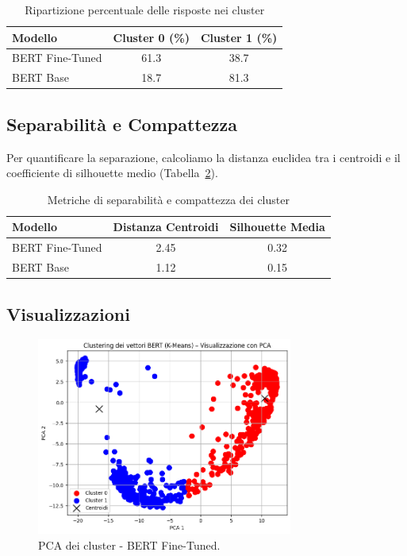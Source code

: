 \documentclass[a4paper,12pt]{article}
\begin{document}
\begin{table}[htbp]
  \centering
  \caption{Ripartizione percentuale delle risposte nei cluster}
  \label{tab:distribuzione}
  \begin{tabular}{lcc}
    \hline
    \textbf{Modello} & \textbf{Cluster 0 (\%)} & \textbf{Cluster 1 (\%)} \\
    \hline
    BERT Fine-Tuned & 61.3 & 38.7 \\
    BERT Base      & 18.7 & 81.3 \\
    \hline
  \end{tabular}
\end{table}

\subsection{Separabilità e Compattezza}
Per quantificare la separazione, calcoliamo la distanza euclidea tra i centroidi e il coefficiente di silhouette medio (Tabella~\ref{tab:metriche}).

\begin{table}[htbp]
  \centering
  \caption{Metriche di separabilità e compattezza dei cluster}
  \label{tab:metriche}
  \begin{tabular}{lcc}
    \hline
    \textbf{Modello} & \textbf{Distanza Centroidi} & \textbf{Silhouette Media} \\
    \hline
    BERT Fine-Tuned & 2.45 & 0.32 \\
    BERT Base      & 1.12 & 0.15 \\
    \hline
  \end{tabular}
\end{table}

\FloatBarrier

\subsection{Visualizzazioni}

\begin{figure}[htbp]
  \centering
  \includegraphics[width=0.75\textwidth]{1.png}
  \caption{PCA dei cluster - BERT Fine-Tuned.}
  \label{fig:pca_tuned}
\end{figure}
\end{document}
